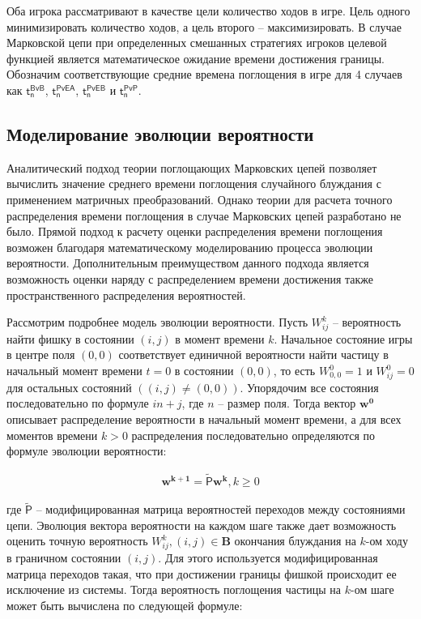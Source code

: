 Оба игрока рассматривают в качестве цели количество ходов в игре. Цель одного минимизировать количество ходов, а цель второго -- максимизировать.
В случае Марковской цепи при определенных смешанных стратегиях игроков целевой функцией является математическое ожидание времени достижения границы.
Обозначим соответствующие средние времена поглощения в игре для 4 случаев как $\boldsymbol{\mathsf{t_n^{BvB}}}$, 
$\boldsymbol{\mathsf{t_n^{PvEA}}}$, $\boldsymbol{\mathsf{t_n^{PvEB}}}$ и $\boldsymbol{\mathsf{t_n^{PvP}}}$.

\subsection{Моделирование эволюции вероятности}\label{subsec:ch2/sec1/sub4}

Аналитический подход теории поглощающих Марковских цепей позволяет вычислить значение среднего времени поглощения случайного блуждания
с применением матричных преобразований. Однако теории для расчета точного распределения времени поглощения в случае Марковских цепей
разработано не было. Прямой подход к расчету оценки распределения времени поглощения возможен благодаря математическому моделированию процесса 
эволюции вероятности. Дополнительным преимуществом данного подхода является возможность оценки наряду с распределением времени достижения также 
пространственного распределения вероятностей. 

Рассмотрим подробнее модель эволюции вероятности. Пусть $W_{ij}^{k}$ -- вероятность найти фишку в состоянии $(i, j)$ в момент времени $k$.
Начальное состояние игры в центре поля $(0, 0)$ соответствует единичной вероятности найти частицу в начальный момент времени $t=0$ в состоянии $(0, 0)$,
то есть $W_{0,0}^{0}=1$ и $W_{ij}^{0}=0$ для остальных состояний $((i, j) \neq (0, 0))$. Упорядочим все состояния последовательно по формуле $in + j$, где $n$ -- размер поля.
Тогда вектор $\boldsymbol{w^{0}}$ описывает распределение вероятности в начальный момент времени, а для всех моментов времени $k > 0$ 
распределения последовательно определяются по формуле эволюции вероятности:

\begin{equation}
    \begin{aligned}
    \boldsymbol{w^{k+1}}=\mathsf{\widetilde{P}}\boldsymbol{w^{k}}, k \geq 0
    \label{eq:evolution}
    \end{aligned}
\end{equation}

где $\mathsf{\widetilde{P}}$ -- модифицированная матрица вероятностей переходов между состояниями цепи. 
Эволюция вектора вероятности на каждом шаге также дает возможность оценить точную вероятность $W_{ij}^{k}, (i, j) \in \boldsymbol{B}$ окончания блуждания на $k$-ом ходу
в граничном состоянии $(i, j)$. Для этого используется модифицированная матрица переходов такая, что при достижении границы фишкой 
происходит ее исключение из системы. Тогда вероятность поглощения частицы на $k$-ом шаге может быть вычислена по следующей формуле:

